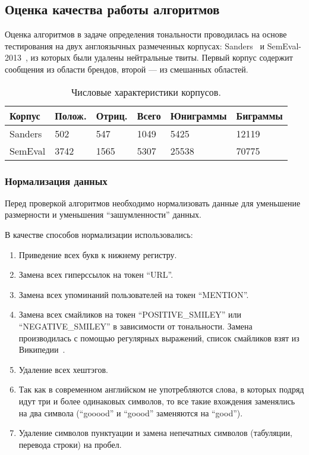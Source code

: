 \subsection{Оценка качества работы алгоритмов}

Оценка алгоритмов в задаче определения тональности проводилась на основе 
тестирования на двух англоязычных размеченных корпусах: Sanders~\cite{Sanders} и SemEval-2013~\cite{SemEval2013},
из которых были удалены нейтральные твиты. Первый корпус содержит 
сообщения из области брендов, второй --- из смешанных областей.


\begin{table}[h]
\caption{Числовые характеристики корпусов.}

	\begin{center}
	    \begin{tabular}{ | l | l | l | l | l | l |}
	    \hline
	    Корпус & Полож. & Отриц. & Всего & Юниграммы & Биграммы \\ \hline
	    Sanders & 502 & 547 & 1049 & 5425 & 12119 \\ \hline
	    SemEval & 3742 & 1565 & 5307 & 25538 & 70775\\ \hline
	    \hline
	    \end{tabular}
	\end{center}
\end{table}


\subsubsection{Нормализация данных}
Перед проверкой алгоритмов необходимо нормализовать данные
для уменьшение размерности и уменьшения ``зашумленности'' данных. 

В качестве способов нормализации использовались:
\begin{enumerate}

\item
Приведение всех букв к нижнему регистру.

\item
Замена всех гиперссылок на токен ``URL''.

\item
Замена всех упоминаний пользователей на токен ``MENTION''.

\item
Замена всех смайликов на токен ``POSITIVE\_SMILEY'' или ``NEGATIVE\_SMILEY'' в 
зависимости от тональности. Замена производилась с помощью регулярных
выражений, список смайликов взят из Википедии~\cite{emoticons}.

\item
Удаление всех хештэгов.

\item
Так как в современном английском не употребляются слова, в которых подряд
идут три и более одинаковых символов, то все такие вхождения заменялись на два символа (``gooood'' и ``goood'' заменяются на ``good'').

\item
Удаление символов пунктуации и замена непечатных символов (табуляции, перевода строки) на пробел.

\end{enumerate}

